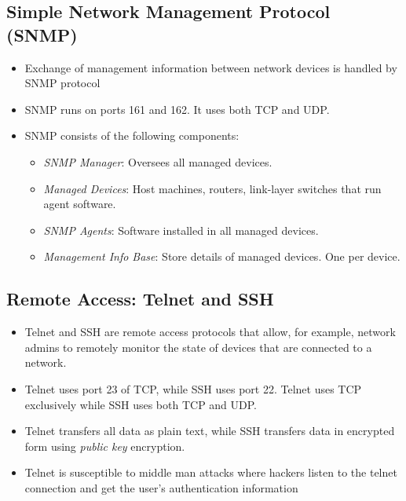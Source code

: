 \documentclass{article}
\theoremstyle{plain}
\theoremstyle{definition}
\begin{document}
\subsection{Simple Network Management Protocol (SNMP)}
\begin{itemize}
    
    \item Exchange of management information between network devices is handled by SNMP protocol
    
    \item SNMP runs on ports 161 and 162. It uses both TCP and UDP. 
    
    \item SNMP consists of the following components:
    \begin{itemize}
        \item \textit{SNMP Manager}: Oversees all managed devices.
        
        \item \textit{Managed Devices}: Host machines, routers, link-layer switches that run agent software. 
        
        \item \textit{SNMP Agents}: Software installed in all managed devices. 
        
        \item \textit{Management Info Base}: Store details of managed devices. One per device. 
    \end{itemize}
\end{itemize}

\subsection{Remote Access: Telnet and SSH}
\begin{itemize}
    \item Telnet and SSH are remote access protocols that allow, for example, network admins to remotely monitor the state of devices that are connected to a network. 
    
    \item Telnet uses port 23 of TCP, while SSH uses port 22. Telnet uses TCP exclusively while SSH uses both TCP and UDP. 
    
    \item Telnet transfers all data as plain text, while SSH transfers data in encrypted form using \textit{public key} encryption. 
    
    \item Telnet is susceptible to middle man attacks where hackers listen to the telnet connection and get the user's authentication information 
\end{itemize}
\end{document}
